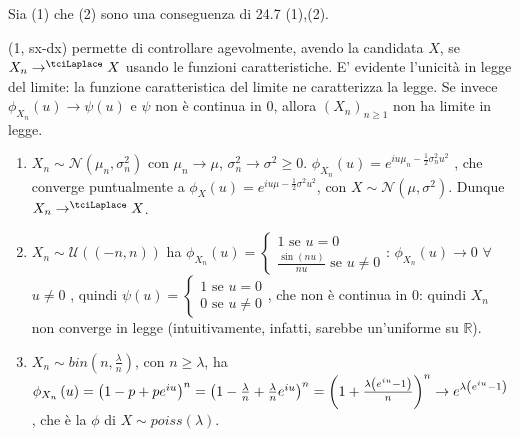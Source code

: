\documentclass{article}
\begin{document}
Sia (1) che (2) sono una conseguenza di 24.7 (1),(2).

(1, sx-\TEXTsymbol{>}dx) permette di controllare agevolmente, avendo la
candidata $X$, se $X_{n}\rightarrow ^{\tciLaplace }X$ usando le funzioni
caratteristiche. E' evidente l'unicit\`{a} in legge del limite: la funzione
caratteristica del limite ne caratterizza la legge. Se invece $\phi
_{X_{n}}\left( u\right) \rightarrow \psi \left( u\right) $ e $\psi $ non 
\`{e} continua in $0$, allora $\left( X_{n}\right) _{n\geq 1}$ non ha limite
in legge.

\begin{enumerate}
\item $X_{n}\sim \mathcal{N}\left( \mu _{n},\sigma _{n}^{2}\right) $ con $%
\mu _{n}\rightarrow \mu $, $\sigma _{n}^{2}\rightarrow \sigma ^{2}\geq 0$. $%
\phi _{X_{n}}\left( u\right) =e^{iu\mu _{n}-\frac{1}{2}\sigma _{n}^{2}u^{2}}$%
, che converge puntualmente a $\phi _{X}\left( u\right) =e^{iu\mu -\frac{1}{2%
}\sigma ^{2}u^{2}}$, con $X\sim \mathcal{N}\left( \mu ,\sigma ^{2}\right) $.
Dunque $X_{n}\rightarrow ^{\tciLaplace }X$.

\item $X_{n}\sim \mathcal{U}\left( \left( -n,n\right) \right) $ ha $\phi
_{X_{n}}\left( u\right) =\left\{ 
\begin{array}{c}
1\text{ se }u=0 \\ 
\frac{\sin \left( nu\right) }{nu}\text{ se }u\neq 0%
\end{array}%
\right. $: $\phi _{X_{n}}\left( u\right) \rightarrow 0$ $\forall $ $u\neq 0$%
, quindi $\psi \left( u\right) =\left\{ 
\begin{array}{c}
1\text{ se }u=0 \\ 
0\text{ se }u\neq 0%
\end{array}%
\right. $, che non \`{e} continua in $0$: quindi $X_{n}$ non converge in
legge (intuitivamente, infatti, sarebbe un'uniforme su $%
\mathbb{R}
$).

\item $X_{n}\sim bin\left( n,\frac{\lambda }{n}\right) $, con $n\geq \lambda 
$, ha $\phi _{X_{n}}\left( u\right) =\left( 1-p+pe^{iu}\right) ^{n}=\left( 1-%
\frac{\lambda }{n}+\frac{\lambda }{n}e^{iu}\right) ^{n}=\left( 1+\frac{%
\lambda \left( e^{iu}-1\right) }{n}\right) ^{n}\rightarrow e^{\lambda \left(
e^{iu}-1\right) }$, che \`{e} la $\phi $ di $X\sim poiss\left( \lambda
\right) $.
\end{enumerate}
\end{document}
